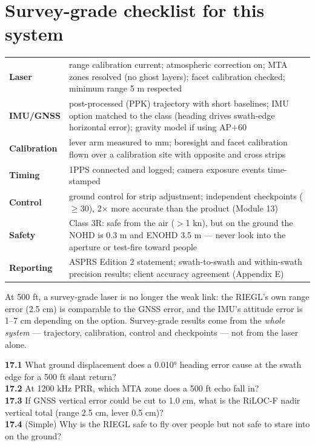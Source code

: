 \section{Survey-grade checklist for this system}
\begin{center}\small
\renewcommand{\arraystretch}{1.22}
\begin{tabularx}{\linewidth}{>{\bfseries}p{3.0cm}X}\toprule
Laser & range calibration current; atmospheric correction on; MTA zones resolved (no ghost layers); facet calibration checked; minimum range 5 m respected\\
IMU/GNSS & post-processed (PPK) trajectory with short baselines; IMU option matched to the class (heading drives swath-edge horizontal error); gravity model if using AP+60\\
Calibration & lever arm measured to mm; boresight and facet calibration flown over a calibration site with opposite and cross strips\\
Timing & 1PPS connected and logged; camera exposure events time-stamped\\
Control & ground control for strip adjustment; independent checkpoints ($\ge$30), 2$\times$ more accurate than the product (Module 13)\\
Safety & Class 3R: safe from the air ($>$1 kn), but on the ground the NOHD is 0.3 m and ENOHD 3.5 m --- never look into the aperture or test-fire toward people\\
Reporting & ASPRS Edition 2 statement; swath-to-swath and within-swath precision results; client accuracy agreement (Appendix E)\\\bottomrule
\end{tabularx}\end{center}

\begin{bigidea}
At 500 ft, a survey-grade laser is no longer the weak link: the RIEGL's own range error (2.5 cm) is comparable to the GNSS error, and the IMU's attitude error is 1--7 cm depending on the option. Survey-grade results come from the \emph{whole system} --- trajectory, calibration, control and checkpoints --- not from the laser alone.
\end{bigidea}

\begin{tryit}
\textbf{17.1} What ground displacement does a 0.010° heading error cause at the swath edge for a 500 ft slant return?\\
\textbf{17.2} At 1200 kHz PRR, which MTA zone does a 500 ft echo fall in?\\
\textbf{17.3} If GNSS vertical error could be cut to 1.0 cm, what is the RiLOC-F nadir vertical total (range 2.5 cm, lever 0.5 cm)?\\
\textbf{17.4} (Simple) Why is the RIEGL safe to fly over people but not safe to stare into on the ground?
\end{tryit}


